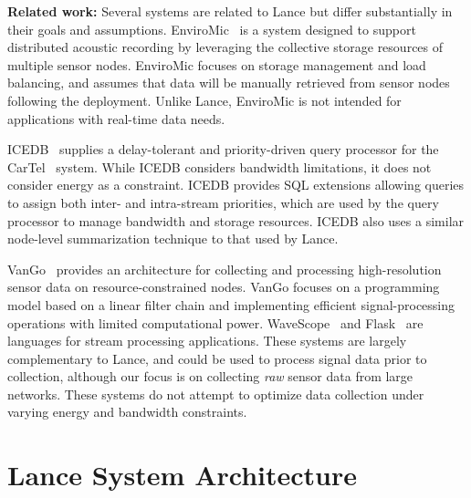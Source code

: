 \documentclass[lettersize]{sig-alternate-konrad}
\begin{document}
{\bf Related work:}
Several systems are related to Lance but differ substantially in their
goals and assumptions.  EnviroMic~\cite{enviromic} is a system
designed to support distributed acoustic recording by leveraging the 
collective storage resources of multiple sensor nodes. 
EnviroMic focuses on storage management and load balancing, and
assumes that data will be manually retrieved from sensor nodes
following the deployment. Unlike Lance, EnviroMic is not intended 
for applications with real-time data needs.

ICEDB~\cite{zhang2007icedb} supplies a delay-tolerant and priority-driven
query processor for the CarTel~\cite{cartel} system. While ICEDB
considers bandwidth limitations, it does not consider energy as a
constraint. ICEDB provides SQL extensions allowing queries to assign
both inter- and intra-stream priorities, which are used by the query
processor to manage bandwidth and storage resources. ICEDB also uses a
similar node-level summarization technique to that used by Lance. 

VanGo~\cite{vango} provides an architecture for collecting and processing
high-resolution sensor data on resource-constrained nodes.  VanGo focuses on a
programming model based on a linear filter chain and implementing efficient
signal-processing operations with limited computational power.
WaveScope~\cite{wavescope} and Flask~\cite{flask-tr} are languages for stream
processing applications.  These systems are largely complementary to Lance,
and could be used to process signal data prior to collection, although our
focus is on collecting {\em raw} sensor data from large networks.  These
systems do not attempt to optimize data collection under varying energy and
bandwidth constraints. 

\section{Lance System Architecture}
\label{sec-architecture}
\end{document}
